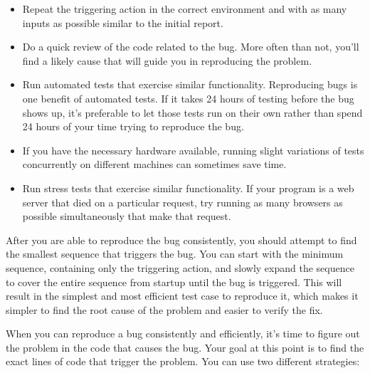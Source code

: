 \begin{itemize}
\item
Repeat the triggering action in the correct environment and with as many inputs as possible similar to the initial report.

\item
Do a quick review of the code related to the bug. More often than not, you’ll find a likely cause that will guide you in reproducing the problem.

\item
Run automated tests that exercise similar functionality. Reproducing bugs is one benefit of automated tests. If it takes 24 hours of testing before the bug shows up, it’s preferable to let those tests run on their own rather than spend 24 hours of your time trying to reproduce the bug.

\item
If you have the necessary hardware available, running slight variations of tests concurrently on different machines can sometimes save time.

\item
Run stress tests that exercise similar functionality. If your program is a web server that died on a particular request, try running as many browsers as possible simultaneously that make that request.
\end{itemize}

After you are able to reproduce the bug consistently, you should attempt to find the smallest sequence that triggers the bug. You can start with the minimum sequence, containing only the triggering action, and slowly expand the sequence to cover the entire sequence from startup until the bug is triggered. This will result in the simplest and most efficient test case to reproduce it, which makes it simpler to find the root cause of the problem and easier to verify the fix.


When you can reproduce a bug consistently and efficiently, it’s time to figure out the problem in the code that causes the bug. Your goal at this point is to find the exact lines of code that trigger the problem. You can use two different strategies:

